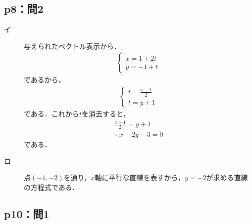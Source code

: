 \documentclass[uplatex,dvipdfmx,a4paper,11pt,fleqn]{jsarticle}
\begin{document}
\subsection*{p8：問2}
		\begin{tleftbar}
            \begin{description}
			\item[イ]
			与えられたベクトル表示から．
			\begin{align*}
				\begin{cases}
					x=1+2t \\
					y=-1+t
				\end{cases}
			\end{align*}
			であるから，
			\begin{align*}
				\begin{cases}
					t=\frac{x-1}{2} \\
					t=y+1
				\end{cases}
			\end{align*}
			である．これから$t$を消去すると，
			\begin{gather*}
				\frac{x-1}{2} = y+1 \\
				\therefore ~ x-2y-3 =0
			\end{gather*}
			である．

			\item[ロ]
			点$(-1,-2)$を通り，$x$軸に平行な直線を表すから，$y=-2$が求める直線の方程式である．
        \end{description}
		\end{tleftbar}
%
\newpage
%
%

\subsection*{p10：問1}
\end{document}
